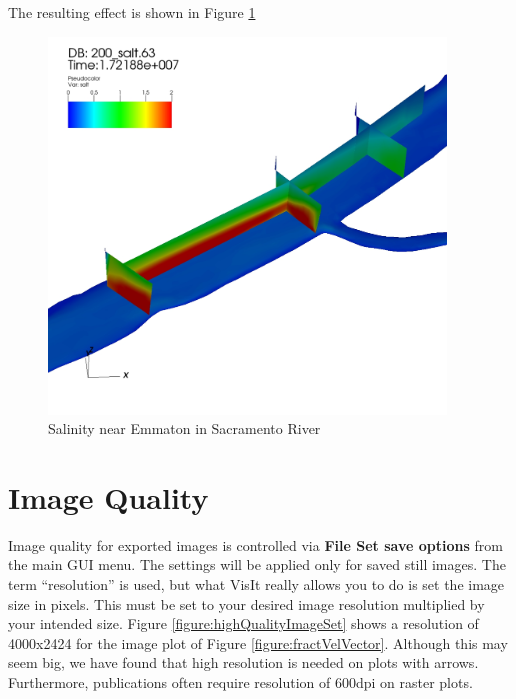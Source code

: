 \documentclass[12pt]{report}
\begin{document}
      The resulting effect is shown in Figure \ref{figure:emmatonSalt3D}
			
			 \begin{figure}
       \begin{center}
       \includegraphics[height=100mm]{emmatonSalt3D}
       \caption{Salinity near Emmaton in Sacramento River }
       \label{figure:emmatonSalt3D}
       \end{center}
       \end{figure} 
			
	 \section{Image Quality}

Image quality for exported images is controlled via {\bf File \textrightarrow Set save options} 
from the main GUI menu. The settings will be applied only for saved still images. 
The term "`resolution"' is used, but what VisIt really allows you to do is set the image
size in pixels. This must be set to your desired image resolution multiplied by your intended
size. Figure \ref{figure:highQualityImageSet} shows a resolution of 4000x2424 for the image
plot of Figure \ref{figure:fractVelVector}. Although this may seem big, we have found that high
resolution is needed on plots with arrows. Furthermore, publications often require resolution
of 600dpi on raster plots.		
		 
\end{document}
